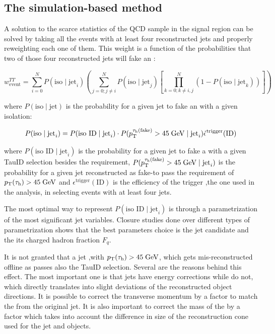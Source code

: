 \subsection{The simulation-based method}
\label{dihad:subsec:eventweight}
\FloatBarrier

A solution to the scarce statistics of the QCD sample in the signal region can be solved by taking all the events with at least four reconstructed jets and properly reweighting each one of them. This weight is a function of the probabilities that two of those four reconstructed jets will fake an \hadtau:

\begin{equation}
w^{TT}_{\text{event}} = \sum_{i=0}^{N}P(\text{iso}\mid \text{jet}_{i})\left(\sum_{j=0; j\neq i}^{N}P(\text{iso}\mid \text{jet}_{j})\left[\prod_{k=0; k\neq i,j}^{N}(1-P(\text{iso}\mid \text{jet}_{k}))\right]\right)
\end{equation}

where $P(\text{iso}\mid \text{jet})$ is the probability for a given jet to fake an \hadtau with a given isolation:

\begin{equation}
P(\text{iso}\mid \text{jet}_{i}) = P(\text{iso ID}\mid \text{jet}_{i}) \cdot P(p_{\text{T}}^{\tau_{\text{h}}(\text{fake})} > 45\;\text{Ge}\kern-0.06667em\text{V}\mid \text{jet}_{i}) \dot \epsilon^{\text{trigger}}(\text{ID})
\end{equation}

where $P(\text{iso ID}\mid \text{jet}_{i})$ is the probability for a given jet to fake a \hadtau with a given TauID selection besides the \pt requirement, $P(p_{\text{T}}^{\tau_{\text{h}}(\text{fake})} > 45\;\text{Ge}\kern-0.06667em\text{V}\mid \text{jet}_{i})$ is the probability for a given jet reconstructed as fake-\hadtau to pass the requirement of $p_{\text{T}}(\tau_{\text{h}})> 45\;\text{Ge}\kern-0.06667em\text{V}$ and $\epsilon^{\text{trigger}}(\text{ID})$ is the efficiency of the trigger ,the one used in the analysis, in selecting events with at least four jets.

The most optimal way to represent $P(\text{iso ID}\mid \text{jet}_{i})$ is through a parametrization of the most significant jet variables. Closure studies done over different types of parametrization shows that the best parameters choice is the jet candidate \pt and the its charged hadron fraction $F_{q}$.

It is not granted that a jet ,with $p_{\text{T}}(\tau_{\text{h}})> 45\;\text{Ge}\kern-0.06667em\text{V}$, which gets mis-reconstructed offline as \hadtau passes also the TauID \pt selection. Several are the reasons behind this effect. The most important one is that jets have energy corrections while \hadtaufake do not, which directly translates into slight deviations of the reconstructed object directions. It is possible to correct the \hadtau transverse momentum by a factor to match the \pt from the original jet. It is also important to correct the mass of the \hadtaufake by a factor which takes into account the difference in size of the reconstruction cone used for the jet and \hadtau objects.

